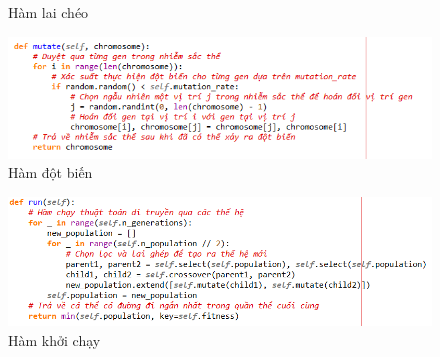 \documentclass[14pt]{article}
\begin{document}
\begin{center}
\begin{figure}[htbp]
		 		\caption{Hàm lai chéo}
		 		\label{fig:mylabel}
		 	\end{figure}
	 	\begin{figure}[htbp]
		 		\centering
		 		\includegraphics[width=\textwidth]{./Image/Hàm đột biến GA.png}
		 		\caption{Hàm đột biến}
		 		\label{fig:mylabel}
		 	\end{figure}
	 	\begin{figure}[htbp]
	 		\centering
	 		\includegraphics[width=\textwidth]{./Image/Hàm khởi chạy GA.png}
	 		\caption{Hàm khởi chạy}
	 		\label{fig:mylabel}
	 	\end{figure}
	\end{center}
\end{document}
